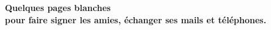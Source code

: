 \begin{center}
{\Huge\textbf{Quelques pages blanches\\ pour faire signer les ami\textperiodcentered{}e\textperiodcentered{}s, échanger ses mails et téléphones.}}
\end{center}
\vspace{2mm}

\vfill
\newpage
